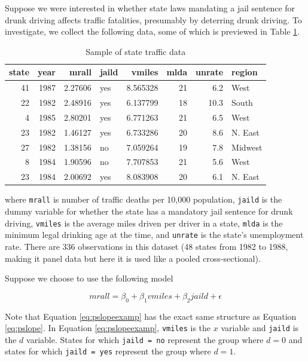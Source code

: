 \documentclass[
]{book}
\begin{document}
Suppose we were interested in whether state laws mandating a jail sentence for drunk driving affects traffic fatalities, presumably by deterring drunk driving. To investigate, we collect the following data, some of which is previewed in Table \ref{tab:trdeath}.

\begin{table}

\caption{\label{tab:trdeath}Sample of state traffic data}
\centering
\begin{tabular}[t]{r|r|r|l|r|r|r|l}
\hline
state & year & mrall & jaild & vmiles & mlda & unrate & region\\
\hline
41 & 1987 & 2.27606 & yes & 8.565328 & 21 & 6.2 & West\\
\hline
22 & 1982 & 2.48916 & yes & 6.137799 & 18 & 10.3 & South\\
\hline
4 & 1985 & 2.80201 & yes & 6.771263 & 21 & 6.5 & West\\
\hline
23 & 1982 & 1.46127 & yes & 6.733286 & 20 & 8.6 & N. East\\
\hline
27 & 1982 & 1.38156 & no & 7.059264 & 19 & 7.8 & Midwest\\
\hline
8 & 1984 & 1.90596 & no & 7.707853 & 21 & 5.6 & West\\
\hline
23 & 1984 & 2.00692 & yes & 8.083908 & 20 & 6.1 & N. East\\
\hline
\end{tabular}
\end{table}

where \texttt{mrall} is number of traffic deaths per 10,000 population, \texttt{jaild} is the dummy variable for whether the state has a mandatory jail sentence for drunk driving, \texttt{vmiles} is the average miles driven per driver in a state, \texttt{mlda} is the minimum legal drinking age at the time, and \texttt{unrate} is the state's unemployment rate. There are 336 observations in this dataset (48 states from 1982 to 1988, making it panel data but here it is used like a pooled cross-sectional).

Suppose we choose to use the following model

\begin{equation}
mrall = \beta_0 + \beta_1vmiles + \beta_2jaild + \epsilon
\label{eq:pslopeexamp}
\end{equation}

Note that Equation \eqref{eq:pslopeexamp} has the exact same structure as Equation \eqref{eq:pslope}. In Equation \eqref{eq:pslopeexamp}, \texttt{vmiles} is the \(x\) variable and \texttt{jaild} is the \(d\) variable. States for which \texttt{jaild\ =\ no} represent the group where \(d=0\) and states for which \texttt{jaild\ =\ yes} represent the group where \(d=1\).
\end{document}

